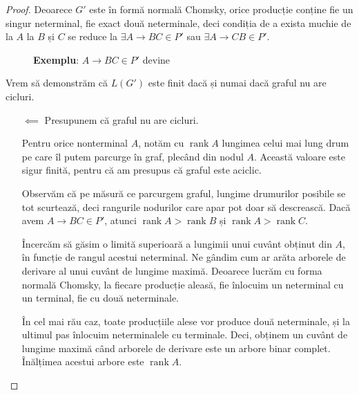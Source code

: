 \documentclass{article}
\DeclareMathOperator{\rank}{rank}
\begin{document}
\begin{enumerate}
\begin{proof}
    Deoarece \(G'\) este în formă normală Chomsky, orice producție conține fie un singur neterminal, fie exact două neterminale, deci condiția de a exista muchie de la \(A\) la \(B\) și \(C\) se reduce la \(\exists A \to B C \in P'\) sau \(\exists A \to C B \in P'\).
    
    \begin{figure}[ht]
        \centering
        \caption*{\textbf{Exemplu}: \(A \to BC \in P'\) devine}
    \end{figure}
    
    Vrem să demonstrăm că \(L(G')\) este finit dacă și numai dacă graful nu are cicluri.
    
    \begin{itemize}
        \item[\(\impliedby\)] Presupunem că graful nu are cicluri.
        
        Pentru orice nonterminal \(A\), notăm cu \(\rank A\) lungimea celui mai lung drum pe care îl putem parcurge în graf, plecând din nodul \(A\). Această valoare este sigur finită, pentru că am presupus că graful este aciclic.
        
        Observăm că pe măsură ce parcurgem graful, lungime drumurilor posibile se tot scurtează, deci rangurile nodurilor care apar pot doar să descrească. Dacă avem \(A \to B C \in P'\), atunci \(\rank A > \rank B\) și \(\rank A > \rank C\).
        
        Încercăm să găsim o limită superioară a lungimii unui cuvânt obținut din \(A\), în funcție de rangul acestui neterminal. Ne gândim cum ar arăta arborele de derivare al unui cuvânt de lungime maximă. Deoarece lucrăm cu forma normală Chomsky, la fiecare producție aleasă, fie înlocuim un neterminal cu un terminal, fie cu două neterminale.

        În cel mai rău caz, toate producțiile alese vor produce două neterminale, și la ultimul pas înlocuim neterminalele cu terminale. Deci, obținem un cuvânt de lungime maximă când arborele de derivare este un arbore binar complet. Înălțimea acestui arbore este \(\rank A\).
                

\end{itemize}
\end{proof}
\end{enumerate}
\end{document}
